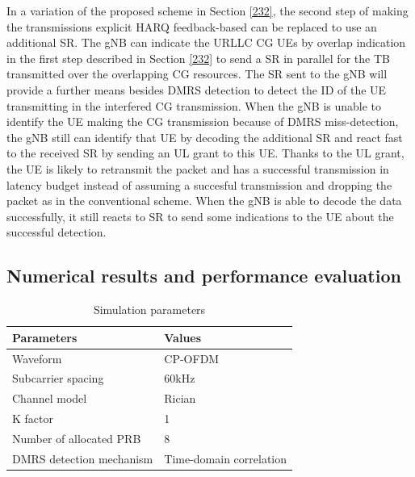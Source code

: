 \documentclass{report}
\begin{document}
In a variation of the proposed scheme in Section \ref{232}, the second step of making the transmissions explicit HARQ feedback-based can be replaced to use an additional SR. The gNB can indicate the URLLC CG UEs by overlap indication in the first step described in Section \ref{232} to send a SR in parallel for the TB transmitted over the overlapping CG resources. The SR sent to the gNB will provide a further means besides DMRS detection to detect the ID of the UE transmitting in the interfered CG transmission. When the gNB is unable to identify the UE making the CG transmission because of DMRS miss-detection, the gNB still can identify that UE by decoding the additional SR and react fast to the received SR by sending an UL grant to this UE. Thanks to the UL grant, the UE is likely to retransmit the packet and has a successful transmission in latency budget instead of assuming a succesful transmission and dropping the packet as in the conventional scheme. When the gNB is able to decode the data successfully, it still reacts to SR to send some indications to the UE about the successful detection.

\subsection{Numerical results and performance evaluation}

\begin{table}[htbp]
\caption{Simulation parameters}
\begin{center}
\begin{tabular}{|p{8em}|p{8em}|}
 \hline
 \textbf{Parameters} & \textbf{Values}\\
 \hline
 Waveform & CP-OFDM\\
 \hline
 Subcarrier spacing & 60kHz\\
 \hline
 Channel model & Rician\\
 \hline
 K factor & 1\\
 \hline
 Number of allocated PRB & 8\\
 \hline
 DMRS detection mechanism & Time-domain correlation\\
 

 
 \hline
\end{tabular}
\label{tab1}
\end{center}
\end{table}
\end{document}
